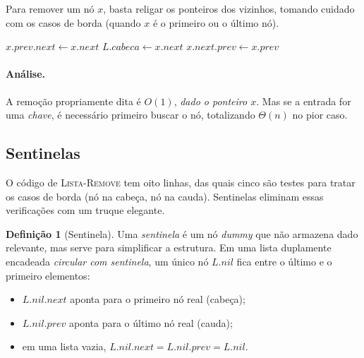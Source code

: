 \documentclass[9pt,a4paper]{extarticle}
\newcommand{\impt}[1]{\textcolor{important}{#1}}
\theoremstyle{definition}
\newtheorem{definition}{Definição}[section]
\begin{document}
Para remover um nó $x$, basta religar os ponteiros dos vizinhos, tomando cuidado com os casos de borda (quando $x$ é o primeiro ou o último nó).

\begin{algorithm}[H]
\caption{\textsc{Lista-Remove}($L, x$) -- remove $x$ de $L$}
\begin{algorithmic}[1]
    \State $x.\mathit{prev}.\mathit{next} \gets x.\mathit{next}$
\Else
    \State $L.\mathit{cabeca} \gets x.\mathit{next}$
\EndIf
{}
    \State $x.\mathit{next}.\mathit{prev} \gets x.\mathit{prev}$
\EndIf
\end{algorithmic}
\end{algorithm}

\paragraph{Análise.} A remoção propriamente dita é \impt{$O(1)$}, \emph{dado o ponteiro $x$}. Mas se a entrada for uma \emph{chave}, é necessário primeiro buscar o nó, totalizando $\Theta(n)$ no pior caso.

\subsection{Sentinelas}

O código de \textsc{Lista-Remove} tem oito linhas, das quais cinco são testes para tratar os \impt{casos de borda} (nó na cabeça, nó na cauda). Sentinelas eliminam essas verificações com um truque elegante.

\begin{definition}[Sentinela]
Uma \emph{sentinela} é um nó \emph{dummy} que não armazena dado relevante, mas serve para simplificar a estrutura. Em uma lista duplamente encadeada \emph{circular com sentinela}, um único nó $L.\mathit{nil}$ fica entre o último e o primeiro elementos:
\begin{itemize}
    \item $L.\mathit{nil}.\mathit{next}$ aponta para o primeiro nó real (cabeça);
    \item $L.\mathit{nil}.\mathit{prev}$ aponta para o último nó real (cauda);
    \item em uma lista vazia, $L.\mathit{nil}.\mathit{next} = L.\mathit{nil}.\mathit{prev} = L.\mathit{nil}$.
\end{itemize}
\end{definition}
\end{document}
